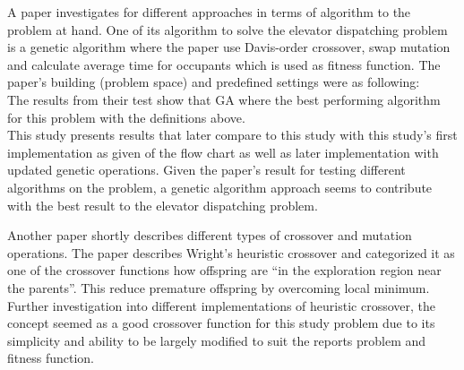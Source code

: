 A paper\cite{ahmed2022investigation} investigates for different approaches in terms of algorithm to the problem at hand. One of its algorithm to solve the elevator dispatching problem is a genetic algorithm where the paper use Davis-order crossover, swap mutation and calculate average time for occupants  which is used as fitness function. The paper's building (problem space) and predefined settings were as following:
\\
The results from their test show that GA where the best performing algorithm for this problem with the definitions above.
\\
This study presents results that later compare to this study with this study's first implementation as given of the flow chart \cite{tartan2016genetic} as well as later implementation with updated genetic operations. Given the paper's result for testing different algorithms on the problem, a genetic algorithm approach seems to contribute with the best result to the elevator dispatching problem.

Another paper\cite{lim2017crossover} shortly describes different types of crossover and mutation operations. The paper describes Wright's heuristic crossover and categorized it as one of the crossover functions how offspring are “in the exploration region near the parents”\cite{lim2017crossover}. This reduce premature offspring by overcoming local minimum. Further investigation into different implementations of heuristic crossover, the concept seemed as a good crossover function for this study problem due to its simplicity and ability to be largely modified to suit the reports problem and fitness function.


